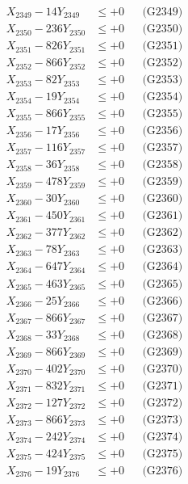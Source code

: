 \documentclass[a4paper,10pt]{article}
\begin{document}
{\begin{align}
X_{2349} - 14Y_{2349} &\leq +0 && \text{(G2349)} \\
X_{2350} - 236Y_{2350} &\leq +0 && \text{(G2350)} \\
\allowbreak
X_{2351} - 826Y_{2351} &\leq +0 && \text{(G2351)} \\
X_{2352} - 866Y_{2352} &\leq +0 && \text{(G2352)} \\
X_{2353} - 82Y_{2353} &\leq +0 && \text{(G2353)} \\
X_{2354} - 19Y_{2354} &\leq +0 && \text{(G2354)} \\
X_{2355} - 866Y_{2355} &\leq +0 && \text{(G2355)} \\
X_{2356} - 17Y_{2356} &\leq +0 && \text{(G2356)} \\
X_{2357} - 116Y_{2357} &\leq +0 && \text{(G2357)} \\
X_{2358} - 36Y_{2358} &\leq +0 && \text{(G2358)} \\
X_{2359} - 478Y_{2359} &\leq +0 && \text{(G2359)} \\
X_{2360} - 30Y_{2360} &\leq +0 && \text{(G2360)} \\
\allowbreak
X_{2361} - 450Y_{2361} &\leq +0 && \text{(G2361)} \\
X_{2362} - 377Y_{2362} &\leq +0 && \text{(G2362)} \\
X_{2363} - 78Y_{2363} &\leq +0 && \text{(G2363)} \\
X_{2364} - 647Y_{2364} &\leq +0 && \text{(G2364)} \\
X_{2365} - 463Y_{2365} &\leq +0 && \text{(G2365)} \\
X_{2366} - 25Y_{2366} &\leq +0 && \text{(G2366)} \\
X_{2367} - 866Y_{2367} &\leq +0 && \text{(G2367)} \\
X_{2368} - 33Y_{2368} &\leq +0 && \text{(G2368)} \\
X_{2369} - 866Y_{2369} &\leq +0 && \text{(G2369)} \\
X_{2370} - 402Y_{2370} &\leq +0 && \text{(G2370)} \\
\allowbreak
X_{2371} - 832Y_{2371} &\leq +0 && \text{(G2371)} \\
X_{2372} - 127Y_{2372} &\leq +0 && \text{(G2372)} \\
X_{2373} - 866Y_{2373} &\leq +0 && \text{(G2373)} \\
X_{2374} - 242Y_{2374} &\leq +0 && \text{(G2374)} \\
X_{2375} - 424Y_{2375} &\leq +0 && \text{(G2375)} \\
X_{2376} - 19Y_{2376} &\leq +0 && \text{(G2376)} \\

\end{align}}
\end{document}
